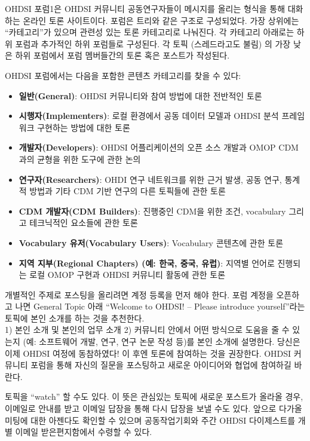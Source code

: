 \documentclass[11pt]{book}
\providecommand{\tightlist}{%
  \setlength{\itemsep}{0pt}\setlength{\parskip}{0pt}}
\theoremstyle{definition}
\theoremstyle{definition}
\theoremstyle{definition}
\theoremstyle{remark}
\let\BeginKnitrBlock\begin \let\EndKnitrBlock\end
\begin{document}
OHDSI 포럼1은 OHDSI 커뮤니티 공동연구자들이 메시지를 올리는 형식을 통해
대화하는 온라인 토론 사이트이다. 포럼은 트리와 같은 구조로 구성되었다.
가장 상위에는 ``카테고리''가 있으며 관련성 있는 토론 카테고리로
나눠진다. 각 카테고리 아래로는 하위 포럼과 추가적인 하위 포럼들로
구성된다. 각 토픽 (스레드라고도 불림) 의 가장 낮은 하위 포럼에서 포럼
멤버들간의 토론 혹은 포스트가 작성된다.

OHDSI 포럼에서는 다음을 포함한 콘텐츠 카테고리를 찾을 수 있다:

\begin{itemize}
\tightlist
\item
  \textbf{일반(General)}: OHDSI 커뮤니티와 참여 방법에 대한 전반적인
  토론
\item
  \textbf{시행자(Implementers)}: 로컬 환경에서 공동 데이터 모델과 OHDSI
  분석 프레임워크 구현하는 방법에 대한 토론
\item
  \textbf{개발자(Developers)}: OHDSI 어플리케이션의 오픈 소스 개발과
  OMOP CDM과의 균형을 위한 도구에 관한 논의
\item
  \textbf{연구자(Researchers)}: OHDI 연구 네트워크를 위한 근거 발생,
  공동 연구, 통계적 방법과 기타 CDM 기반 연구의 다른 토픽들에 관한 토론
\item
  \textbf{CDM 개발자(CDM Builders)}: 진행중인 CDM을 위한 조건,
  vocabulary 그리고 테크닉적인 요소들에 관한 토론
\item
  \textbf{Vocabulary 유저(Vocabulary Users)}: Vocabulary 콘텐츠에 관한
  토론
\item
  \textbf{지역 지부(Regional Chapters) (예: 한국, 중국, 유럽)}: 지역별
  언어로 진행되는 로컬 OMOP 구현과 OHDSI 커뮤니티 활동에 관한 토론
\end{itemize}

개별적인 주제로 포스팅을 올리려면 계정 등록을 먼저 해야 한다. 포럼
계정을 오픈하고 나면 General Topic 아래 ``Welcome to OHDSI! -- Please
introduce yourself''라는 토픽에 본인 소개를 하는 것을 추천한다.\\
1) 본인 소개 및 본인의 업무 소개 2) 커뮤니티 안에서 어떤 방식으로 도움을
줄 수 있는지 (예: 소프트웨어 개발, 연구, 연구 논문 작성 등)를 본인
소개에 설명한다. 당신은 이제 OHDSI 여정에 동참하였다! 이 후엔 토론에
참여하는 것을 권장한다. OHDSI 커뮤니티 포럼을 통해 자신의 질문을
포스팅하고 새로운 아이디어와 협업에 참여하길 바란다. 

\BeginKnitrBlock{rmdimportant}
토픽을 ``watch'' 할 수도 있다. 이 뜻은 관심있는 토픽에 새로운 포스트가
올라올 경우, 이메일로 안내를 받고 이메일 답장을 통해 다시 답장을 보낼
수도 있다. 앞으로 다가올 미팅에 대한 아젠다도 확인할 수 있으며
공동작업기회와 주간 OHDSI 다이제스트를 개별 이메일 받은편지함에서 수령할
수 있다.
\EndKnitrBlock{rmdimportant}
\end{document}
